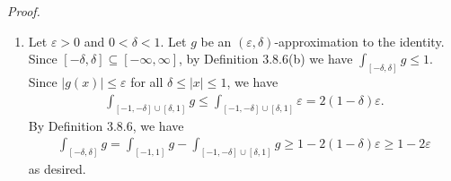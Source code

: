 \documentclass{book}
\newcommand{\pff}{\vspace{.25em}\noindent\emph{Proof.}~~}
\begin{document}
\pff
\begin{enumerate}
    \item Let $\varepsilon > 0$ and $0 < \delta < 1$. Let $g$ be an $(\varepsilon, \delta)$-approximation to the identity. Since $[-\delta, \delta] \subseteq [-\infty, \infty]$, by Definition 3.8.6(b) we have $\int_{[-\delta, \delta]} g \leq 1$. Since $|g(x)| \leq \varepsilon$ for all $\delta \leq |x| \leq 1$, we have
        \begin{align*}
            \int_{[-1, -\delta] \cup [\delta, 1]} g
            \leq \int_{[-1, -\delta] \cup [\delta, 1]} \varepsilon
            = 2(1 - \delta)\varepsilon.
        \end{align*}
    By Definition 3.8.6, we have
        \begin{align*}
            \int_{[-\delta, \delta]} g
            = \int_{[-1, 1]} g - \int_{[-1, -\delta] \cup [\delta, 1]} g
            \geq 1 - 2(1 - \delta)\varepsilon
            \geq 1 - 2\varepsilon
        \end{align*}
    as desired.


\end{enumerate}
\end{document}
